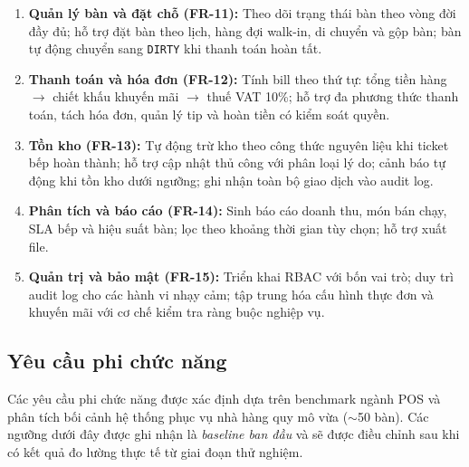 \begin{enumerate}
  \item \textbf{Quản lý bàn và đặt chỗ (FR-11):} Theo dõi trạng thái bàn theo vòng đời đầy đủ; hỗ trợ đặt bàn theo lịch, hàng đợi walk-in, di chuyển và gộp bàn; bàn tự động chuyển sang \texttt{DIRTY} khi thanh toán hoàn tất.
  \item \textbf{Thanh toán và hóa đơn (FR-12):} Tính bill theo thứ tự: tổng tiền hàng $\rightarrow$ chiết khấu khuyến mãi $\rightarrow$ thuế VAT 10\%; hỗ trợ đa phương thức thanh toán, tách hóa đơn, quản lý tip và hoàn tiền có kiểm soát quyền.
  \item \textbf{Tồn kho (FR-13):} Tự động trừ kho theo công thức nguyên liệu khi ticket bếp hoàn thành; hỗ trợ cập nhật thủ công với phân loại lý do; cảnh báo tự động khi tồn kho dưới ngưỡng; ghi nhận toàn bộ giao dịch vào audit log.
  \item \textbf{Phân tích và báo cáo (FR-14):} Sinh báo cáo doanh thu, món bán chạy, SLA bếp và hiệu suất bàn; lọc theo khoảng thời gian tùy chọn; hỗ trợ xuất file.
  \item \textbf{Quản trị và bảo mật (FR-15):} Triển khai RBAC với bốn vai trò; duy trì audit log cho các hành vi nhạy cảm; tập trung hóa cấu hình thực đơn và khuyến mãi với cơ chế kiểm tra ràng buộc nghiệp vụ.
\end{enumerate}
 
\subsection{Yêu cầu phi chức năng}
 
Các yêu cầu phi chức năng được xác định dựa trên benchmark ngành POS và phân tích bối cảnh hệ thống phục vụ nhà hàng quy mô vừa ($\sim$50 bàn). Các ngưỡng dưới đây được ghi nhận là \textit{baseline ban đầu} và sẽ được điều chỉnh sau khi có kết quả đo lường thực tế từ giai đoạn thử nghiệm.
 
